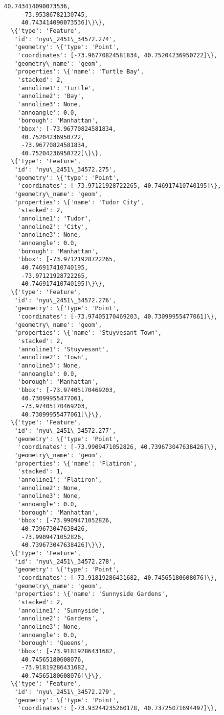 \documentclass[11pt]{article}
\begin{document}
\begin{tcolorbox}[breakable, size=fbox, boxrule=.5pt, pad at break*=1mm, opacityfill=0]
\begin{Verbatim}[commandchars=\\\{\}]
     40.743414090073536,
     -73.95386782130745,
     40.743414090073536]\}\},
  \{'type': 'Feature',
   'id': 'nyu\_2451\_34572.274',
   'geometry': \{'type': 'Point',
    'coordinates': [-73.96770824581834, 40.75204236950722]\},
   'geometry\_name': 'geom',
   'properties': \{'name': 'Turtle Bay',
    'stacked': 2,
    'annoline1': 'Turtle',
    'annoline2': 'Bay',
    'annoline3': None,
    'annoangle': 0.0,
    'borough': 'Manhattan',
    'bbox': [-73.96770824581834,
     40.75204236950722,
     -73.96770824581834,
     40.75204236950722]\}\},
  \{'type': 'Feature',
   'id': 'nyu\_2451\_34572.275',
   'geometry': \{'type': 'Point',
    'coordinates': [-73.97121928722265, 40.746917410740195]\},
   'geometry\_name': 'geom',
   'properties': \{'name': 'Tudor City',
    'stacked': 2,
    'annoline1': 'Tudor',
    'annoline2': 'City',
    'annoline3': None,
    'annoangle': 0.0,
    'borough': 'Manhattan',
    'bbox': [-73.97121928722265,
     40.746917410740195,
     -73.97121928722265,
     40.746917410740195]\}\},
  \{'type': 'Feature',
   'id': 'nyu\_2451\_34572.276',
   'geometry': \{'type': 'Point',
    'coordinates': [-73.97405170469203, 40.73099955477061]\},
   'geometry\_name': 'geom',
   'properties': \{'name': 'Stuyvesant Town',
    'stacked': 2,
    'annoline1': 'Stuyvesant',
    'annoline2': 'Town',
    'annoline3': None,
    'annoangle': 0.0,
    'borough': 'Manhattan',
    'bbox': [-73.97405170469203,
     40.73099955477061,
     -73.97405170469203,
     40.73099955477061]\}\},
  \{'type': 'Feature',
   'id': 'nyu\_2451\_34572.277',
   'geometry': \{'type': 'Point',
    'coordinates': [-73.9909471052826, 40.739673047638426]\},
   'geometry\_name': 'geom',
   'properties': \{'name': 'Flatiron',
    'stacked': 1,
    'annoline1': 'Flatiron',
    'annoline2': None,
    'annoline3': None,
    'annoangle': 0.0,
    'borough': 'Manhattan',
    'bbox': [-73.9909471052826,
     40.739673047638426,
     -73.9909471052826,
     40.739673047638426]\}\},
  \{'type': 'Feature',
   'id': 'nyu\_2451\_34572.278',
   'geometry': \{'type': 'Point',
    'coordinates': [-73.91819286431682, 40.74565180608076]\},
   'geometry\_name': 'geom',
   'properties': \{'name': 'Sunnyside Gardens',
    'stacked': 2,
    'annoline1': 'Sunnyside',
    'annoline2': 'Gardens',
    'annoline3': None,
    'annoangle': 0.0,
    'borough': 'Queens',
    'bbox': [-73.91819286431682,
     40.74565180608076,
     -73.91819286431682,
     40.74565180608076]\}\},
  \{'type': 'Feature',
   'id': 'nyu\_2451\_34572.279',
   'geometry': \{'type': 'Point',
    'coordinates': [-73.93244235260178, 40.73725071694497]\},

\end{Verbatim}
\end{tcolorbox}
\end{document}
